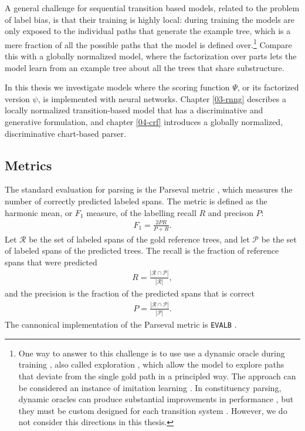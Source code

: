     A general challenge for sequential transition based models, related to the problem of label bias, is that their training is highly local: during training the models are only exposed to the individual paths that generate the example tree, which is a mere fraction of all the possible paths that the model is defined over.\footnote{One way to answer to this challenge is to use use a dynamic oracle during training \citep{goldberg2013dynamic}, also called exploration \citep{ballesteros2016exploration,stern2017minimal}, which allow the model to explore paths that deviate from the single gold path in a principled way. The approach can be considered an instance of imitation learning \citep{vlachos2012imitation,he2012imitation}. In constituency parsing, dynamic oracles can produce substantial improvements in performance \citep{ballesteros2016exploration}, but they must be custom designed for each transition system \citep{klein2018reinforce}. However, we do not consider this directions in this thesis.} Compare this with a globally normalized model, where the factorization over parts lets the model learn from an example tree about all the trees that share substructure.

    In this thesis we investigate models where the scoring function $\Psi$, or its factorized version $\psi$, is implemented with neural networks. Chapter \ref{03-rnng} describes a locally normalized transition-based model that has a discriminative and generative formulation, and chapter \ref{04-crf} introduces a globally normalized, discriminative chart-based parser.


  \subsection{Metrics}
    The standard evaluation for parsing is the Parseval metric \citep{black1991parseval}, which measures the number of correctly predicted labeled spans. The metric is defined as the harmonic mean, or $F_1$ measure, of the labelling recall $R$ and precison $P$:
    \begin{align}
      \label{eq:fscore}
      F_1 = \frac{2 PR}{P + R}.
    \end{align}
    Let $\mathcal{R}$ be the set of labeled spans of the gold reference trees, and let $\mathcal{P}$ be the set of labeled spans of the predicted trees. The recall is the fraction of reference spans that were predicted
    \begin{align*}
      R = \frac{|\mathcal{R} \cap \mathcal{P}|}{|\mathcal{R}|},
    \end{align*}
    and the precision is the fraction of the predicted spans that is correct
    \begin{align*}
      P = \frac{|\mathcal{R} \cap \mathcal{P}|}{|\mathcal{P}|}.
    \end{align*}
    The cannonical implementation of the Parseval metric is \verb!EVALB! \citep{sekine1997evalb}.


